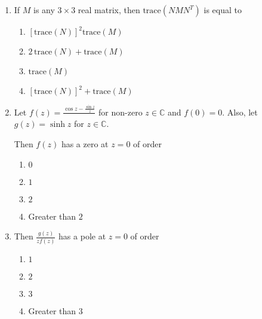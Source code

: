 \documentclass[journal,12pt,onecolumn]{IEEEtran}
\theoremstyle{remark}
\begin{document}
\begin{enumerate}
\item If \(M\) is any \(3 \times 3\) real matrix, then \(\mathrm{trace}(NMN^T)\) is equal to
\\[-0.3em]\makebox[\textwidth][r]{\textit{[GATE EE 2025]}}

\begin{multicols}{2}
\begin{enumerate}[label=(\Alph*)]
\item \(\left[ \mathrm{trace}(N) \right]^2 \mathrm{trace}(M)\)
\item \(2\,\mathrm{trace}(N) + \mathrm{trace}(M)\)
\item \(\mathrm{trace}(M)\)
\item \(\left[ \mathrm{trace}(N) \right]^2 + \mathrm{trace}(M)\)
\end{enumerate}
\end{multicols}


\item Let \( f(z) = \frac{\cos z - \frac{\sin z}{z}}{\,}\) for non-zero \(z \in \mathbb{C}\) and \(f(0) = 0\).  
Also, let \( g(z) = \sinh z \) for \( z \in \mathbb{C} \).

Then \(f(z)\) has a zero at \(z=0\) of order
\\[-0.3em]\makebox[\textwidth][r]{\textit{[GATE EE 2025]}}

\begin{multicols}{2}
\begin{enumerate}[label=(\Alph*)]
\item \(0\)
\item \(1\)
\item \(2\)
\item Greater than \(2\)
\end{enumerate}
\end{multicols}

\item Then \(\frac{g(z)}{z f(z)}\) has a pole at \(z=0\) of order
\\[-0.3em]\makebox[\textwidth][r]{\textit{[GATE EE 2025]}}

\begin{multicols}{2}
\begin{enumerate}[label=(\Alph*)]
\item \(1\)
\item \(2\)
\item \(3\)
\item Greater than \(3\)
\end{enumerate}
\end{multicols}



\end{enumerate}
\end{document}
